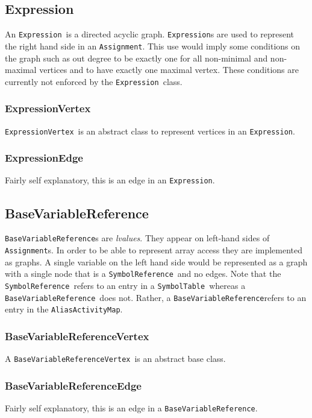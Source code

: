 \documentclass{book}
\newcommand{\AliasActivityMap}{{\tt AliasActivityMap}}
\newcommand{\Assignment}{{\tt Assignment}}
\newcommand{\BaseVariableReference}{{\tt BaseVariableReference}}
\newcommand{\BaseVariableReferenceVertex}{{\tt BaseVariableReferenceVertex}}
\newcommand{\Expression}{{\tt Expression}}
\newcommand{\ExpressionVertex}{{\tt ExpressionVertex}}
\newcommand{\SymbolReference}{{\tt SymbolReference}}
\newcommand{\SymbolTable}{{\tt SymbolTable}}
\begin{document}
\subsection{Expression}
\label{ssec:Expression}
An \Expression\ is a directed acyclic graph. {\Expression}s are used to represent
the right hand side in an \Assignment. 
This use would imply some conditions 
on the graph such as out degree to be exactly one for all non-minimal and non-maximal 
vertices and to have exactly one maximal vertex. 
These conditions are currently 
not enforced by the \Expression\ class.

\subsubsection{ExpressionVertex}
\ExpressionVertex\ is an abstract class to represent vertices in an \Expression.

\subsubsection{ExpressionEdge}
Fairly self explanatory, this is an edge in an \Expression.

\subsection{BaseVariableReference}
\label{ssec:BaseVariableReference}

{\BaseVariableReference}s are {\em lvalues}. 
They appear on left-hand sides
of {\Assignment}s. 
In order to be able to represent array access they are implemented as graphs.
A single variable on the left hand side would be represented as a graph with a single 
node that is a \SymbolReference\ and no edges. 
Note that the \SymbolReference\ refers 
to an entry in a \SymbolTable\ whereas a \BaseVariableReference\ does not. 
Rather, 
a \BaseVariableReference refers to an entry in the \AliasActivityMap.

\subsubsection{BaseVariableReferenceVertex}
A \BaseVariableReferenceVertex\ is an abstract base class.

\subsubsection{BaseVariableReferenceEdge}
Fairly self explanatory, this is an edge in a \BaseVariableReference.
\end{document}
